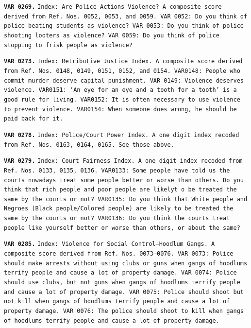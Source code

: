 \documentclass[12pt]{article}
\newenvironment{shift}{\begin{adjustwidth}{1cm}{}}{\end{adjustwidth}}
\begin{document}
\begin{shift}
	 	\vspace{.01in}
		\texttt{\textbf{VAR 0269.}}	\texttt{Index: Are Police Actions Violence?  A composite score derived from Ref. Nos. 0052, 0053, and 0059. VAR 0052: Do you think of police beating students as violence?  VAR 0053: Do you think of police shooting looters as violence?  VAR 0059: Do you think of police stopping to frisk people as violence?}


		\vspace{.01in}
		\texttt{\textbf{VAR 0273.}}	\texttt{Index: Retributive Justice Index.  A composite score derived from Ref. Nos. 0148, 0149, 0151, 0152, and 0154.  VAR0148: People who commit murder deserve capital punishment.  VAR 0149: Violence deserves violence.  VAR0151: `An eye for an eye and a tooth for a tooth' is a good rule for living.  VAR0152: It is often necessary to use violence to prevent violence.  VAR0154: When someone does wrong, he should be paid back for it. }

		\vspace{.01in}
		\texttt{\textbf{VAR 0278.}}	\texttt{Index: Police/Court Power Index.  A one digit index recoded from Ref. Nos. 0163, 0164, 0165.  See those above. }


		\vspace{.01in}
		\texttt{\textbf{VAR 0279.}}	\texttt{Index: Court Fairness Index.  A one digit index recoded from Ref. Nos. 0133, 0135, 0136.  VAR0133: Some people have told us the courts nowadays treat some people better or worse than others.  Do you think that rich people and poor people are likelyt o be treated the same by the courts or not?  VAR0135: Do you think that White people and Negroes (Black people/Colored people)  are likely to be treated the same by the courts or not?  VAR0136: Do you think the courts treat people like yourself better or worse than others, or about the same? }

		\vspace{.01in}
		\texttt{\textbf{VAR 0285.}} 	\texttt{Index: Violence for Social Control--Hoodlum Gangs.  A composite score derived from Ref. Nos. 0073--0076. VAR 0073: Police should make arrests without using clubs or guns when gangs of hoodlums terrify people and cause a lot of property damage.  VAR 0074: Police should use clubs, but not guns when gangs of hoodlums terrify people and cause a lot of property damage.  VAR 0075: Police should shoot but not kill when gangs of hoodlums terrify people and cause a lot of property damage.  VAR 0076: The police should shoot to kill when gangs of hoodlums terrify people and cause a lot of property damage. }

	 \end{shift}
	 \vspace{.05in} \normalsize
\end{document}
